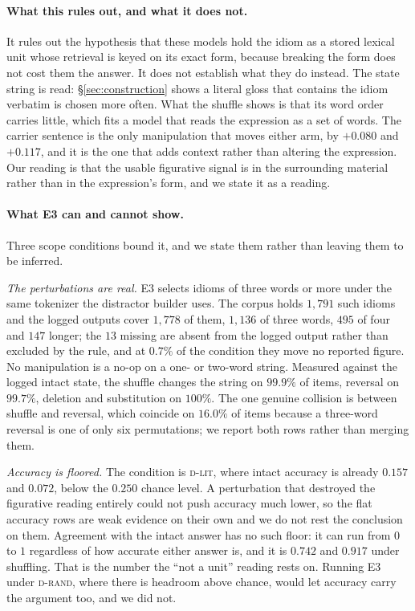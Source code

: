 \documentclass[11pt]{article}
\newcommand{\Drand}{\textsc{d-rand}}
\newcommand{\Dlit}{\textsc{d-lit}}
\begin{document}
\paragraph{What this rules out, and what it does not.} It rules out the
hypothesis that these models hold the idiom as a stored lexical unit whose
retrieval is keyed on its exact form, because breaking the form does not cost them
the answer. It does not establish what they do instead. The state string is
read: \S\ref{sec:construction} shows a literal gloss that contains the idiom
verbatim is chosen more often. What the shuffle shows is that its word order
carries little, which fits a model that reads the expression as a set of words. The
carrier sentence is the only manipulation that moves either arm, by $+0.080$ and
$+0.117$, and it is the one that adds context rather than altering the expression.
Our reading is that the usable figurative signal is in the surrounding material
rather than in the expression's form, and we state it as a reading.

\paragraph{What E3 can and cannot show.} Three scope conditions bound it, and we
state them rather than leaving them to be inferred.

\emph{The perturbations are real.} E3 selects idioms of three words or more under
the same tokenizer the distractor builder uses. The corpus holds $1{,}791$ such
idioms and the logged outputs cover $1{,}778$ of them, $1{,}136$ of three words,
$495$ of four and $147$ longer; the $13$ missing are absent from the logged output
rather than excluded by the rule, and at $0.7\%$ of the condition they move no
reported figure. No manipulation is a no-op on a one- or two-word string. Measured against the logged intact state, the
shuffle changes the string on $99.9\%$ of items, reversal on $99.7\%$, deletion and
substitution on $100\%$. The one genuine collision is between shuffle and reversal,
which coincide on $16.0\%$ of items because a three-word reversal is one of only
six permutations; we report both rows rather than merging them.

\emph{Accuracy is floored.} The condition is \Dlit{}, where intact accuracy is
already $0.157$ and $0.072$, below the $0.250$ chance level. A perturbation that
destroyed the figurative reading entirely could not push accuracy much lower, so
the flat accuracy rows are weak evidence on their own and we do not rest the
conclusion on them. Agreement with the intact answer has no such floor: it can run
from $0$ to $1$ regardless of how accurate either answer is, and it is $0.742$ and
$0.917$ under shuffling. That is the number the ``not a unit'' reading rests on.
Running E3 under \Drand, where there is headroom above chance, would let accuracy
carry the argument too, and we did not.
\end{document}
